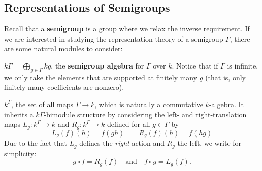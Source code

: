\documentclass[12pt]{article}
\DeclareMathOperator{\1}{\mathbbm{1}}
\begin{document}
\subsection{Representations of Semigroups}
Recall that a \textbf{semigroup} is a group where we relax the inverse requirement. If we are interested in studying the representation 
theory of a semigroup $\Gamma$, there are some natural modules to consider:
\begin{ex}
	$k\Gamma=\bigoplus_{g\in \Gamma}kg$, the \textbf{semigroup algebra} for $\Gamma$ over $k$. Notice that if $\Gamma$ is infinite, we only take 
	the elements that are supported at finitely many $g$ (that is, only finitely many coefficients are nonzero).
\end{ex}
\begin{ex}\label{ex:bimod} $k^\Gamma$, the set of all maps $\Gamma\to k$, which is naturally a commutative $k$-algebra. It inherits a $k\Gamma$-bimodule structure 
	by considering the left- and right-translation maps $L_g:k^\Gamma\to k$ and $R_g:k^\Gamma\to k$ defined for all $g\in\Gamma$ by 
	\[L_g(f)(h)= f(gh)\qquad R_g(f)(h)=f(hg)\]
	Due to the fact that $L_g$ defines the \textit{right} action and $R_g$ the left, we write for simplicity:
	\[g\circ f=R_g(f)\quad\text{and}\quad f\circ g=L_g(f).\]
\end{ex}
\end{document}

